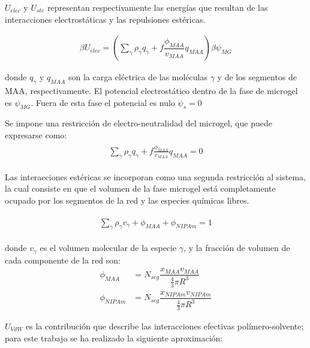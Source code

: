 $U_{elec}$ y $U_{ste}$ representan respectivamente las energ\'ias que resultan de las interacciones electrost\'aticas y las repulsiones est\'ericas.

\begin{align}
	  \beta U_{elec} =\left(\sum_{\gamma } {\rho_\gamma q_\gamma + f\dfrac{\phi_{MAA}}{v_{MAA}}q_{MAA}}\right)\beta\psi_{MG}
\end{align}

\noindent donde $q_\gamma$ y $q_{MAA}$ son la carga el\'ectrica de las moléculas $\gamma$ y de los segmentos de MAA, respectivamente.
El potencial electrost\'atico dentro de la fase de microgel es $\psi_{MG}$. Fuera de esta fase el potencial es nulo $\psi_s = 0$

Se impone una restricci\'on de electro-neutralidad del microgel, que puede expresarse como:
%
%
\begin{align}
	\begin{aligned}
		\sum_{\gamma  } \rho_\gamma q_\gamma + f\frac{\phi_{MAA}}{v_{MAA}}q_{MAA}=0
	\end{aligned}
	\label{eq:gel:charge-neutrality}
\end{align}

Las interacciones est\'ericas se incorporan como una segunda restricci\'on al sistema, la cual consiste en que el volumen de la fase microgel est\'a completamente ocupado por los segmentos de la red y las especies qu\'imicas libres.

%
\begin{align}
	\begin{aligned}
		\sum_{\gamma } \rho_\gamma v_\gamma  + \phi_{MAA} + \phi_{NIPAm} = 1
	\end{aligned}
	\label{eq:gel:packing}
\end{align}



\noindent donde $v_\gamma$  es el volumen molecular de la especie $\gamma$, y la fracci\'on de volumen de cada componente de la red son: 
%
%
\begin{align}
	\phi_{MAA}&=N_{seg}\dfrac{x_{MAA}v_{MAA}}{\frac{4}{3}\pi R^3}\\
	\phi_{NIPAm}&=N_{seg}\dfrac{x_{NIPAm}v_{NIPAm}}{\frac{4}{3}\pi R^3}
\end{align}



$U_{VdW}$ es la contribuci\'on que describe las interacciones efectivas pol\'imero-solvente; para este trabajo  se ha realizado la siguiente aproximaci\'on: 

